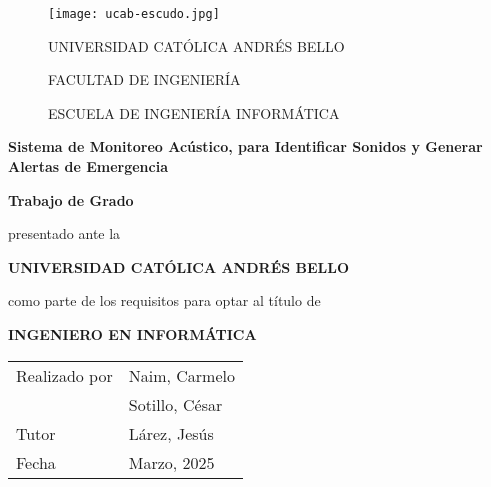 \newcommand{\touppercase}[1]{\MakeUppercase{#1}}

\newcommand{\universidad}{Universidad Católica Andrés Bello}
\newcommand{\titulo}{Sistema de Monitoreo Acústico, para Identificar Sonidos y Generar Alertas de Emergencia \\}
\newcommand{\tutor}{Lárez, Jesús}

\newcommand{\membrete}{
  \normalsize\selectfont
  \touppercase{\universidad} \par
  FACULTAD DE INGENIERÍA \par
  ESCUELA DE INGENIERÍA INFORMÁTICA \par
}

\newcommand{\prelude}{
  \textbf{Trabajo de Grado} \par
  presentado ante la \par
  \touppercase{\textbf{\universidad}} \par
  como parte de los requisitos para optar al título de \par
  \touppercase{\textbf{Ingeniero en Informática}} \par
}

\newcommand{\details}{
  \begin{tabularx}{\textwidth}{X >{\hsize=1.35\hsize}X}
    Realizado por & Naim, Carmelo  \\
                  & Sotillo, César \\
    Tutor         & \tutor         \\
    Fecha         & Marzo, 2025    \\
  \end{tabularx}
}

\begin{center}
  \begin{figure}[h]
    \centering
    \begin{minipage}{0.15\textwidth}
      \texttt{[image: ucab-escudo.jpg]}
    \end{minipage}
    \begin{minipage}{0.7\textwidth}
      \centering
      \renewcommand{\baselinestretch}{1.5}
      \membrete
    \end{minipage}
  \end{figure}
  \vspace*{\fill}
  \textbf{\titulo}
  \vspace*{\fill}
  \prelude
  \vspace*{\fill}
  \details
\end{center}

\clearpage
